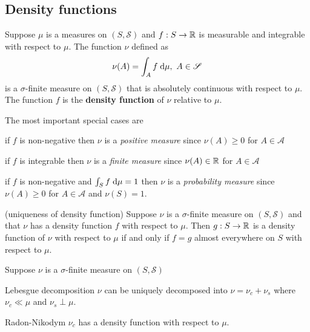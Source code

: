 \subsection{Density functions}

\begin{definition}
Suppose $\mu$ is a measures on $(S, \mathscr{S})$ and $f : S \to \mathbb{R}$ is measurable and integrable with respect to $\mu$. The function $\nu$ defined as
\begin{equation}
\nu(A) = \int_A f \; \text{d} \mu, \ A \in \mathscr{S}
\end{equation}
is a $\sigma$-finite measure on $(S, \mathscr{S})$ that is absolutely continuous with respect to $\mu$. 
The function $f$ is the \textbf{density function} of $\nu$ relative to $\mu$.
\end{definition}

The most important special cases are
\begin{compactitem}
\item if $f$ is non-negative then $\nu$ is a \emph{positive measure} since $\nu(A) \geq 0$ for $A \in \mathscr{A}$
\item if $f$ is integrable then $\nu$ is a \emph{finite measure} since $\nu(A) \in \mathbb{R}$ for $A \in \mathscr{A}$
\item if $f$ is non-negative and $\int_S f \; \text{d} \mu = 1$ then $\nu$ is a \emph{probability measure} since $\nu(A) \geq 0$ for $A \in \mathscr{A}$ and $\nu(S) = 1$.
\end{compactitem}

\begin{theorem}(uniqueness of density function)
Suppose $\nu$ is a $\sigma$-finite measure on $(S, \mathscr{S})$ and that $\nu$ has a density function $f$ with respect to $\mu$. Then $g : S \to \mathbb{R}$ is a density function of $\nu$ with respect to $\mu$ if and only if $f = g$ almost everywhere on $S$ with respect to $\mu$.
\end{theorem}

\begin{theorem}
Suppose $\nu$ is a $\sigma$-finite measure on $(S, \mathscr{S})$
\begin{compactdesc}
\item [Lebesgue decomposition] $\nu$ can be uniquely decomposed into $\nu = \nu_c + \nu_s$ where $\nu_c \ll \mu$ and $\nu_s \perp \mu$.
\item [Radon-Nikodym] $\nu_c$ has a density function with respect to $\mu$.
\end{compactdesc}
\end{theorem}

